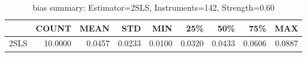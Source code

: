 \begin{table}[ht]
\centering
\caption{bias summary: Estimator=2SLS, Instruments=142, Strength=0.60}
\begin{tabular}{lrrrrrrrr}
\toprule
 & COUNT & MEAN & STD & MIN & 25\% & 50\% & 75\% & MAX \\
\midrule
2SLS & 10.0000 & 0.0457 & 0.0233 & 0.0100 & 0.0320 & 0.0433 & 0.0606 & 0.0887 \\
\bottomrule
\end{tabular}
\end{table}
